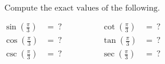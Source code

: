 $$
\text{Compute the exact values of the following.}
$$

$$
\begin{align*}
  \sin\left(\frac{\pi}{3}\right) &=\ ? \qquad&\qquad \cot\left(\frac{\pi}{3}\right) &=\ ? \\[2ex]
  \cos\left(\frac{\pi}{3}\right) &=\ ? \qquad&\qquad \tan\left(\frac{\pi}{3}\right) &=\ ? \\[2ex]
  \csc\left(\frac{\pi}{3}\right) &=\ ? \qquad&\qquad \sec\left(\frac{\pi}{3}\right) &=\ ?
\end{align*}
$$
